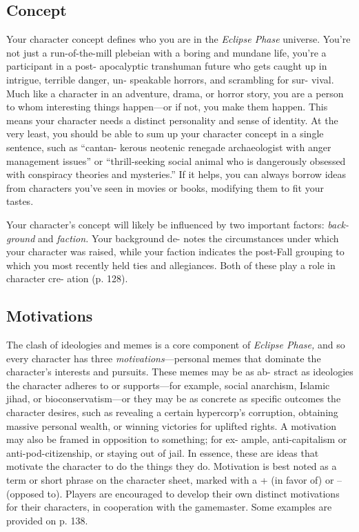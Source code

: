 \subsection{Concept}

Your character concept defines who you are 
in the \textit{Eclipse Phase }universe. You're not just 
a run-of-the-mill plebeian with a boring and 
mundane life, you're a participant in a post-
apocalyptic transhuman future who gets 
caught up in intrigue, terrible danger, un-
speakable horrors, and scrambling for sur-
vival. Much like a character in an adventure, 
drama, or horror story, you are a person 
to whom interesting things happen—or if 
not, you make them happen. This means 
your character needs a distinct personality 
and sense of identity. At the very least, you 
should be able to sum up your character 
concept in a single sentence, such as ``cantan-
kerous neotenic renegade archaeologist with 
anger management issues'' or ``thrill-seeking 
social animal who is dangerously obsessed 
with conspiracy theories and mysteries.'' If 
it helps, you can always borrow ideas from 
characters you've seen in movies or books, 
modifying them to fit your tastes.

Your character's concept will likely be 
influenced by two important factors: \textit{back-}
\textit{ground} and \textit{faction.} Your background de-
notes the circumstances under which your 
character was raised, while your faction 
indicates the post-Fall grouping to which 
you most recently held ties and allegiances. 
Both of these play a role in character cre-
ation (p. 128).

\subsection{Motivations}

The clash of ideologies and memes is a core 
component of \textit{Eclipse Phase,} and so every 
character has three \textit{motivations}—personal 
memes that dominate the character's interests 
and pursuits. These memes may be as ab-
stract as ideologies the character adheres to 
or supports—for example, social anarchism, 
Islamic jihad, or bioconservatism—or they 
may be as concrete as specific outcomes the 
character desires, such as revealing a certain 
hypercorp's corruption, obtaining massive 
personal wealth, or winning victories for 
uplifted rights. A motivation may also be 
framed in opposition to something; for ex-
ample, anti-capitalism or anti-pod-citizenship, 
or staying out of jail. In essence, these are 
ideas that motivate the character to do the 
things they do. Motivation is best noted as a 
term or short phrase on the character sheet, 
marked with a + (in favor of) or – (opposed 
to). Players are encouraged to develop their 
own distinct motivations for their characters, 
in cooperation with the gamemaster. Some 
examples are provided on p. 138.

